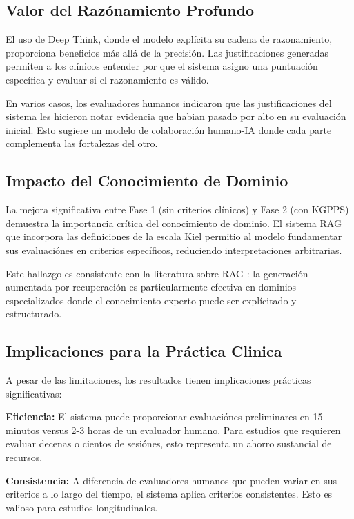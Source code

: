 \documentclass[12pt,a4paper,twoside]{book}
\begin{document}
\subsection{Valor del Razónamiento Profundo}

El uso de Deep Think, donde el modelo explícita su cadena de razonamiento, proporciona beneficios más allá de la precisión. Las justificaciones generadas permiten a los clínicos entender por que el sistema asigno una puntuación específica y evaluar si el razonamiento es válido.

En varios casos, los evaluadores humanos indicaron que las justificaciones del sistema les hicieron notar evidencia que habian pasado por alto en su evaluación inicial. Esto sugiere un modelo de colaboración humano-IA donde cada parte complementa las fortalezas del otro.

\subsection{Impacto del Conocimiento de Dominio}

La mejora significativa entre Fase 1 (sin criterios clínicos) y Fase 2 (con KGPPS) demuestra la importancia crítica del conocimiento de dominio. El sistema RAG que incorpora las definiciones de la escala Kiel permitio al modelo fundamentar sus evaluaciónes en criterios específicos, reduciendo interpretaciones arbitrarias.

Este hallazgo es consistente con la literatura sobre RAG \cite{wu2025rag}: la generación aumentada por recuperación es particularmente efectiva en dominios especializados donde el conocimiento experto puede ser explícitado y estructurado.

\subsection{Implicaciones para la Práctica Clinica}

A pesar de las limitaciones, los resultados tienen implicaciones prácticas significativas:

\textbf{Eficiencia:} El sistema puede proporcionar evaluaciónes preliminares en 15 minutos versus 2-3 horas de un evaluador humano. Para estudios que requieren evaluar decenas o cientos de sesiónes, esto representa un ahorro sustancial de recursos.

\textbf{Consistencia:} A diferencia de evaluadores humanos que pueden variar en sus criterios a lo largo del tiempo, el sistema aplica criterios consistentes. Esto es valioso para estudios longitudinales.
\end{document}
